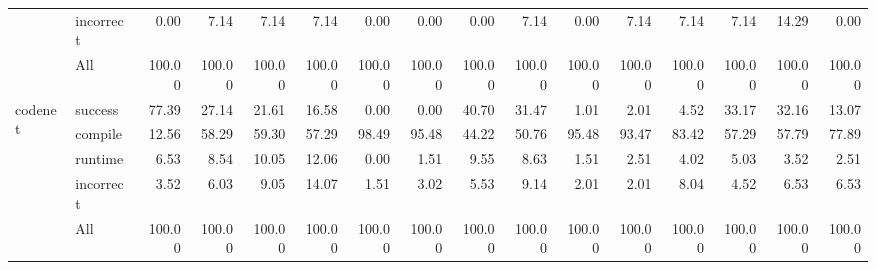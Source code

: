 \begin{tabular}{llrrrrrrrrrrrrrr}
 & incorrect & 0.00 & 7.14 & 7.14 & 7.14 & 0.00 & 0.00 & 0.00 & 7.14 & 0.00 & 7.14 & 7.14 & 7.14 & 14.29 & 0.00 \\
 & All & 100.00 & 100.00 & 100.00 & 100.00 & 100.00 & 100.00 & 100.00 & 100.00 & 100.00 & 100.00 & 100.00 & 100.00 & 100.00 & 100.00 \\
\cline{1-16}
\multirow[t]{5}{*}{codenet} & success & 77.39 & 27.14 & 21.61 & 16.58 & 0.00 & 0.00 & 40.70 & 31.47 & 1.01 & 2.01 & 4.52 & 33.17 & 32.16 & 13.07 \\
 & compile & 12.56 & 58.29 & 59.30 & 57.29 & 98.49 & 95.48 & 44.22 & 50.76 & 95.48 & 93.47 & 83.42 & 57.29 & 57.79 & 77.89 \\
 & runtime & 6.53 & 8.54 & 10.05 & 12.06 & 0.00 & 1.51 & 9.55 & 8.63 & 1.51 & 2.51 & 4.02 & 5.03 & 3.52 & 2.51 \\
 & incorrect & 3.52 & 6.03 & 9.05 & 14.07 & 1.51 & 3.02 & 5.53 & 9.14 & 2.01 & 2.01 & 8.04 & 4.52 & 6.53 & 6.53 \\
 & All & 100.00 & 100.00 & 100.00 & 100.00 & 100.00 & 100.00 & 100.00 & 100.00 & 100.00 & 100.00 & 100.00 & 100.00 & 100.00 & 100.00 \\
\cline{1-16}
\bottomrule
\end{tabular}
